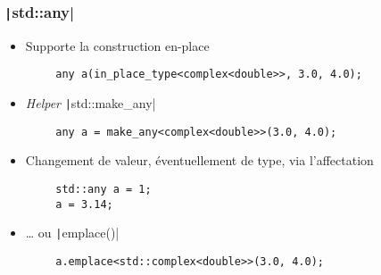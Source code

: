 \documentclass[C++.tex]{subfiles}
\begin{document}
\begin{frame}[fragile]
	\frametitle{\texttt|std::any|}
	\begin{itemize}
		\item Supporte la construction en-place
	\end{itemize}

	\begin{verbatim}
		any a(in_place_type<complex<double>>, 3.0, 4.0);
	\end{verbatim}

	\begin{itemize}
		\item \textit{Helper} \texttt|std::make_any|
	\end{itemize}

	\begin{verbatim}
		any a = make_any<complex<double>>(3.0, 4.0);
	\end{verbatim}

	\begin{itemize}
		\item Changement de valeur, éventuellement de type, via l'affectation
	\end{itemize}

	\begin{verbatim}
		std::any a = 1;
		a = 3.14;
	\end{verbatim}

	\begin{itemize}
		\item \ldots{} ou \texttt|emplace()|
	\end{itemize}

	\begin{verbatim}
		a.emplace<std::complex<double>>(3.0, 4.0);
	\end{verbatim}

\end{frame}
\end{document}
